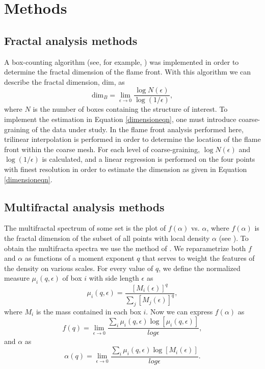 \documentclass{emulateapj}
\begin{document}
\section{Methods}\label{Methods}

\subsection{Fractal analysis methods}\label{FractalMethods}
A box-counting algorithm (see, for example, \cite{Falconer2003}) was implemented in order to determine the fractal dimension of the flame front. With this algorithm we can describe the fractal dimension, $\mathrm{dim}$, as
\begin{equation}\label{dimensioneqn}
	\mathrm{dim}_B = \lim_{\epsilon \to 0} \frac{\log N(\epsilon)}{\log (1 / \epsilon)},
\end{equation}
where $N$ is the number of boxes containing the structure of interest.  To implement the estimation in Equation \ref{dimensioneqn}, one must introduce coarse-graining of the data under study. In the flame front analysis performed here, trilinear interpolation is performed in order to determine the location of the flame front within the coarse mesh. For each level of coarse-graining, $\log{N(\epsilon)}$ and $\log{(1/\epsilon)}$ is calculated, and a linear regression is performed on the four points with finest resolution in order to estimate the dimension as given in Equation \ref{dimensioneqn}.

\subsection{Multifractal analysis methods}\label{MultifractalMethods}
The multifractal spectrum of some set is the plot of $f(\alpha)$ vs. $\alpha$, where $f(\alpha)$ is the fractal dimension of the subset of all points with local density $\alpha$ (see \cite{Falconer2003}). To obtain the multifracta spectra we use the method of \cite{Chhabra1989}. We reparametrize both $f$ and $\alpha$ as functions of a moment exponent $q$ that serves to weight the features of the density on various scales. For every value of $q$, we define the normalized measure $\mu_i(q, \epsilon)$ of box $i$ with side length $\epsilon$ as
\begin{equation} 
	\mu_i(q, \epsilon) = \frac{[M_i(\epsilon)]^q}{\sum_j[M_j(\epsilon)]^q},
\end{equation}
where $M_i$ is the mass contained in each box $i$. Now we can express $f(\alpha)$ as
\begin{equation}
	f(q) = \lim_{\epsilon \to 0} \frac{\sum_i \mu_i(q, \epsilon) \log[\mu_i(q, \epsilon)]}{log \epsilon},
\end{equation}
and $\alpha$ as
\begin{equation}
	\alpha (q) = \lim_{\epsilon \to 0} \frac{\sum_i \mu_i(q, \epsilon) \log[M_i(\epsilon)]}{log \epsilon}.
\end{equation}
\end{document}

